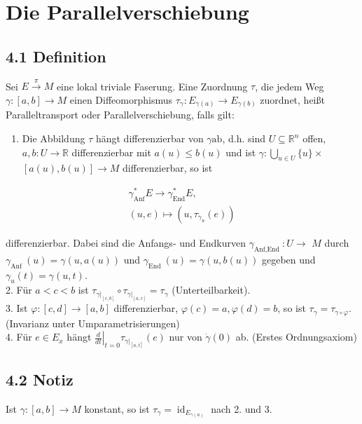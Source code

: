 \pagebreak

\section{Die Parallelverschiebung}
\subsection*{4.1 Definition}
Sei $E \xrightarrow{\pi} M$ eine lokal triviale Faserung. Eine Zuordnung $\tau$, die jedem Weg $\gamma:[a, b] \rightarrow M$ einen Diffeomorphismus $\tau_{\gamma}: E_{\gamma(a)} \rightarrow E_{\gamma(b)}$ zuordnet, heißt Paralleltransport oder Parallelverschiebung, falls gilt:

\begin{enumerate}
  \item Die Abbildung $\tau$ hängt differenzierbar von $\gamma \mathrm{ab}$, d.h. sind $U \subseteq \mathbb{R}^{n}$ offen, $a, b: U \rightarrow \mathbb{R}$ differenzierbar mit $a(u) \leq b(u)$ und ist $\gamma: \bigcup_{u \in U}\{u\} \times$ $[a(u), b(u)] \rightarrow M$ differenzierbar, so ist
\end{enumerate}

$$
\begin{gathered}
\gamma_{\mathrm{Anf}}^{*} E \rightarrow \gamma_{\mathrm{End}}^{*} E, \\
(u, e) \mapsto\left(u, \tau_{\gamma_{u}}(e)\right)
\end{gathered}
$$

differenzierbar. Dabei sind die Anfangs- und Endkurven $\gamma_{\text {Anf,End }}: U \rightarrow$ $M$ durch $\gamma_{\text {Anf }}(u)=\gamma(u, a(u))$ und $\gamma_{\text {End }}(u)=\gamma(u, b(u))$ gegeben und $\gamma_{u}(t)=\gamma(u, t)$.\\
2. Für $a<c<b$ ist $\tau_{\left.\gamma\right|_{[c, b]}} \circ \tau_{\left.\gamma\right|_{[a, c]}}=\tau_{\gamma}$ (Unterteilbarkeit).\\
3. Ist $\varphi:[c, d] \rightarrow[a, b]$ differenzierbar, $\varphi(c)=a, \varphi(d)=b$, so ist $\tau_{\gamma}=\tau_{\gamma \circ \varphi}$. (Invarianz unter Umparametrisierungen)\\
4. Für $e \in E_{x}$ hängt $\left.\frac{d}{d t}\right|_{t=0} \tau_{\left.\gamma\right|_{[a, t]}}(e)$ nur von $\dot{\gamma}(0)$ ab. (Erstes Ordnungsaxiom)

\subsection*{4.2 Notiz}
Ist $\gamma:[a, b] \rightarrow M$ konstant, so ist $\tau_{\gamma}=\operatorname{id}_{E_{\gamma(a)}}$ nach 2. und 3.

